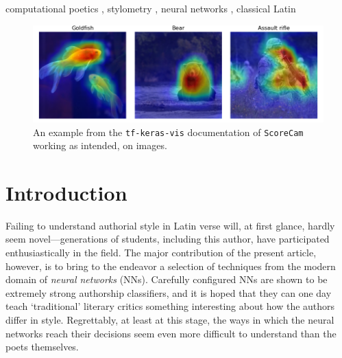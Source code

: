 \documentclass[
    twocolumn,
    hf,
]{ceurart}
\begin{document}
\begin{keywords}
    computational poetics \sep
    stylometry \sep
    neural networks \sep
    classical Latin
\end{keywords}

\maketitle

\begin{figure}
    \includegraphics[width=\linewidth]{figures/scorecam.png}
    \caption{An example from the \texttt{tf-keras-vis} documentation
        of \texttt{ScoreCam} working as intended, on images.}
    \label{fig:sc_img}
\end{figure}

\section{Introduction}

Failing to understand authorial style in Latin verse will, at first glance,
hardly seem novel---generations of students, including this author, have
participated enthusiastically in the field. The major contribution of the
present article, however, is to bring to the endeavor a selection of techniques
from the modern domain of \emph{neural networks} (NNs). Carefully configured NNs
are shown to be extremely strong authorship classifiers, and it is hoped that
they can one day teach `traditional' literary critics something interesting
about how the authors differ in style. Regrettably, at least at this stage, the
ways in which the neural networks reach their decisions seem even more difficult
to understand than the poets themselves.
\end{document}
